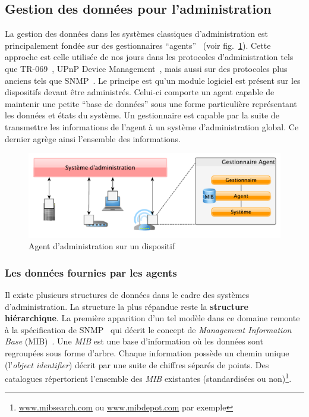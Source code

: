 \subsection{Gestion des données pour l'administration}
La gestion des données dans les systèmes classiques d'administration est principalement fondée sur des gestionnaires \enquote{agents}~\cite{CCITT:X700} (voir fig.~\ref{fig:rw:supervision:administration}). Cette approche est celle utilisée de nos jours dans les protocoles d'administration tels que TR-069~\cite{BBF:tr069}, UPnP Device Management~\cite{UPnP:DM2}, mais aussi sur des protocoles plus anciens tels que SNMP~\cite{IETF:SNMP}. Le principe est qu'un module logiciel est présent sur les dispositifs devant être administrés. Celui-ci comporte un agent capable de maintenir une petite \enquote{base de données} sous une forme particulière représentant les données et états du système. Un gestionnaire est capable par la suite de transmettre les informations de l'agent à un système d'administration global. Ce dernier agrège ainsi l'ensemble des informations.
\begin{figure}[ht]
    \centering
    \includegraphics[width=.70\textwidth]{fig/rw-supervision-administration}
    \caption{Agent d'administration sur un dispositif}\label{fig:rw:supervision:administration}
\end{figure}

\subsubsection{Les données fournies par les agents}
Il existe plusieurs structures de données dans le cadre des systèmes d'administration. La structure la plus répandue reste la \textbf{structure hiérarchique}. La première apparition d'un tel modèle dans ce domaine remonte à la spécification de SNMP~\cite{IETF:SNMP} qui décrit le concept de \textit{Management Information Base} (MIB)~\cite{IETF:MIB}. Une \textit{MIB} est une base d'information où les données sont regroupées sous forme d'arbre. Chaque information possède un chemin unique (l'\textit{object identifier}) décrit par une suite de chiffres séparés de points. Des catalogues répertorient l'ensemble des \textit{MIB} existantes (standardisées ou non)\footnote{\url{www.mibsearch.com} ou \url{www.mibdepot.com} par exemple}.

